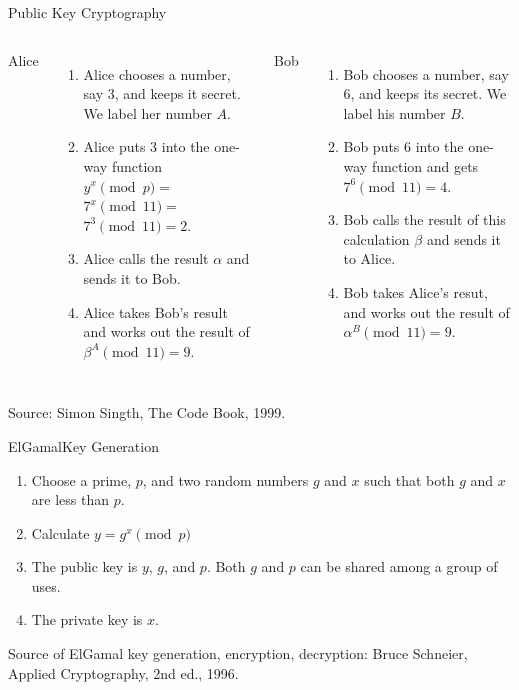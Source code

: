 \documentclass[utf8]{beamer}
\begin{document}
\begin{frame}{Public Key Cryptography}

 \begin{columns}[t]
   Alice
   \begin{enumerate}
   \item<1-> Alice chooses a number, say 3, and keeps it secret. We
     label her number $A$.
   \item<2-> Alice puts 3 into the one-way function\\
         $y^x\pmod p = $ \\
         $7^x\pmod{11} = $ \\
         $7^3\pmod{11} = 2$.
   \item<3-> Alice calls the result  $\alpha$ and
     sends it to Bob.
   \item<4-> Alice takes Bob's result and works out the result of
     $\beta^A\pmod{11} = 9$.
   \end{enumerate}

  Bob
  \begin{enumerate}
  \item<1-> Bob chooses a number, say 6, and keeps its secret. We
    label his number $B$.
  \item<2-> Bob puts 6 into the one-way function and gets
    $7^6\pmod{11} = 4$.
  \item<3-> Bob calls the result of this calculation $\beta$ and
    sends it to Alice.
  \item<4-> Bob takes Alice's resut, and works out the result of
    $\alpha^B\pmod{11} = 9$.
  \end{enumerate}  
\end{columns}

{\tiny
Source: Simon Singth, The Code Book, 1999.
}
\end{frame}

\begin{frame}{ElGamal}{Key Generation}

  \begin{enumerate}
    \item Choose a prime, $p$, and two random numbers $g$ and $x$ such
      that both $g$ and $x$ are less than $p$.
    \item Calculate $y = g^x\pmod{p}$
    \item The public key is $y$, $g$, and $p$. Both $g$ and $p$ can be
      shared among a group of uses. 
    \item The private key is $x$.

  \end{enumerate}

{\tiny
Source of ElGamal key generation, encryption, decryption: Bruce
Schneier, Applied Cryptography, 2nd ed., 1996.
}
\end{frame}
\end{document}
